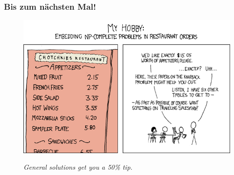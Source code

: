 \begin{frame}
	\frametitle{Bis zum nächsten Mal!}
	
	\begin{figure}[H]
		\includegraphics[height=0.8 \textheight]{images/287_np_complete.png}
		
		\textit{\scriptsize{General solutions get you a 50\% tip.}}
	\end{figure}
\end{frame}

